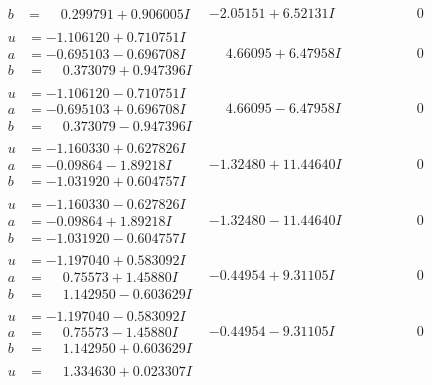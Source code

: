 \documentclass[1p]{elsarticle_modified}
\theoremstyle{definition}
\begin{document}
$$\begin{array}{c|c|c}
\begin{aligned}
b &= \phantom{-}0.299791 + 0.906005 I\end{aligned}
 & -2.05151 + 6.52131 I & \phantom{-0.000000 } 0 \\ \hline\begin{aligned}
u &= -1.106120 + 0.710751 I \\
a &= -0.695103 - 0.696708 I \\
b &= \phantom{-}0.373079 + 0.947396 I\end{aligned}
 & \phantom{-}4.66095 + 6.47958 I & \phantom{-0.000000 } 0 \\ \hline\begin{aligned}
u &= -1.106120 - 0.710751 I \\
a &= -0.695103 + 0.696708 I \\
b &= \phantom{-}0.373079 - 0.947396 I\end{aligned}
 & \phantom{-}4.66095 - 6.47958 I & \phantom{-0.000000 } 0 \\ \hline\begin{aligned}
u &= -1.160330 + 0.627826 I \\
a &= -0.09864 - 1.89218 I \\
b &= -1.031920 + 0.604757 I\end{aligned}
 & -1.32480 + 11.44640 I & \phantom{-0.000000 } 0 \\ \hline\begin{aligned}
u &= -1.160330 - 0.627826 I \\
a &= -0.09864 + 1.89218 I \\
b &= -1.031920 - 0.604757 I\end{aligned}
 & -1.32480 - 11.44640 I & \phantom{-0.000000 } 0 \\ \hline\begin{aligned}
u &= -1.197040 + 0.583092 I \\
a &= \phantom{-}0.75573 + 1.45880 I \\
b &= \phantom{-}1.142950 - 0.603629 I\end{aligned}
 & -0.44954 + 9.31105 I & \phantom{-0.000000 } 0 \\ \hline\begin{aligned}
u &= -1.197040 - 0.583092 I \\
a &= \phantom{-}0.75573 - 1.45880 I \\
b &= \phantom{-}1.142950 + 0.603629 I\end{aligned}
 & -0.44954 - 9.31105 I & \phantom{-0.000000 } 0 \\ \hline\begin{aligned}
u &= \phantom{-}1.334630 + 0.023307 I \\

\end{aligned}
\end{array}$$
\end{document}

